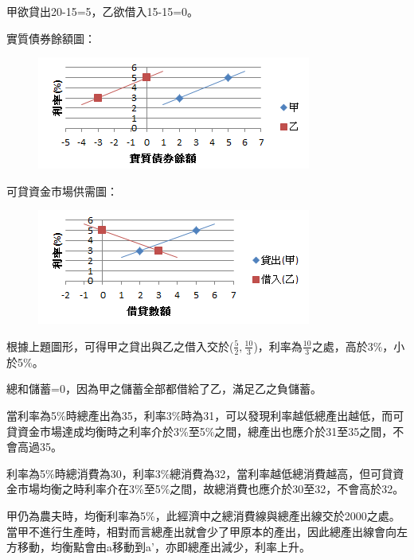 \documentclass[12pt]{article}
\begin{document}
\begin{CJK}{UTF8}{cwmb}
\begin{num}
\item 
	\begin{num}
		\item 甲欲貸出20-15=5，乙欲借入15-15=0。
		\item 實質債券餘額圖：
\begin{figure}[htp]
\centering
\includegraphics[scale=1.00]{1b.png}
\end{figure} 
		\item 可貸資金市場供需圖：
\begin{figure}[htp]
\centering
\includegraphics[scale=1.00]{1c.png}
\end{figure} 
		\item 根據上題圖形，可得甲之貸出與乙之借入交於($\frac{5}{2},\frac{10}{3}$)，利率為$\frac{10}{3}$之處，高於3\%，小於5\%。
		\item 總和儲蓄=0，因為甲之儲蓄全部都借給了乙，滿足乙之負儲蓄。
		\item 當利率為5\%時總產出為35，利率3\%時為31，可以發現利率越低總產出越低，而可貸資金市場達成均衡時之利率介於3\%至5\%之間，總產出也應介於31至35之間，不會高過35。
		\item 利率為5\%時總消費為30，利率3\%總消費為32，當利率越低總消費越高，但可貸資金市場均衡之時利率介在3\%至5\%之間，故總消費也應介於30至32，不會高於32。
	\end{num}
\item 
	\begin{num}
		\item 甲仍為農夫時，均衡利率為5\%，此經濟中之總消費線與總產出線交於2000之處。當甲不進行生產時，相對而言總產出就會少了甲原本的產出，因此總產出線會向左方移動，均衡點會由a移動到a'，亦即總產出減少，利率上升。
\begin{figure}[htp]

\end{figure}
\end{num}
\end{num}
\end{CJK}
\end{document}
